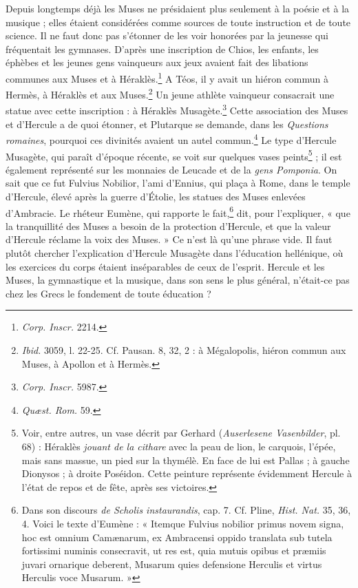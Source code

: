 \documentclass[a4paper, 11pt, oneside, polutonikogreek, french]{article}
\begin{document}
Depuis longtemps déjà les Muses ne présidaient plus seulement à la poésie et à la musique ; elles étaient considérées comme sources de toute instruction et de toute science. Il ne faut donc pas s'étonner de les voir honorées par la jeunesse qui fréquentait les gymnases. D'après une inscription de Chios, les enfants, les éphèbes et les jeunes gens vainqueurs aux jeux avaient fait des libations communes aux Muses et à Héraklès.\footnote{\emph{Corp. Inscr.} 2214.} A Téos, il y avait un hiéron commun à Hermès, à Héraklès et aux Muses.\footnote{\emph{Ibid.} 3059, l. 22-25. Cf. Pausan. 8, 32, 2 : à Mégalopolis, hiéron commun aux Muses, à Apollon et à Hermès.} Un jeune athlète vainqueur consacrait une statue avec cette inscription : à Héraklès Musagète.\footnote{\emph{Corp. Inscr.} 5987.} Cette association des Muses et d'Hercule a de quoi étonner, et Plutarque se demande, dans les \emph{Questions romaines}, pourquoi ces divinités avaient un autel commun.\footnote{\emph{Quæst. Rom.} 59.} Le type d'Hercule Musagète, qui paraît d'époque récente, se voit sur quelques vases peints\footnote{Voir, entre autres, un vase décrit par Gerhard (\emph{Auserlesene Vasenbilder}, pl. 68) : Héraklès \emph{jouant de la cithare} avec la peau de lion, le carquois, l'épée, mais sans massue, un pied sur la thymélè. En face de lui est Pallas ; à gauche Dionysos ; à droite Poséidon. Cette peinture représente évidemment Hercule à l'état de repos et de fête, après ses victoires.} ; il est également représenté sur les monnaies de Leucade et de la \emph{gens Pomponia}. On sait que ce fut Fulvius Nobilior, l'ami d'Ennius, qui plaça à Rome, dans le temple d'Hercule, élevé après la guerre d'Étolie, les statues des Muses enlevées d'Ambracie. Le rhéteur Eumène, qui rapporte le fait,\footnote{Dans son discours \emph{de Scholis instaurandis}, cap. 7. Cf. Pline, \emph{Hist. Nat.} 35, 36, 4. Voici le texte d'Eumène : « Itemque Fulvius nobilior primus novem signa, hoc est omnium Camænarum, ex Ambracensi oppido translata sub tutela fortissimi numinis consecravit, ut res est, quia mutuis opibus et præmiis juvari ornarique deberent, Musarum quies defensione Herculis et virtus Herculis voce Musarum. »} dit, pour l'expliquer, « que la tranquillité des Muses a besoin de la protection d'Hercule, et que la valeur d'Hercule réclame la voix des Muses. » Ce n'est là qu'une phrase vide. Il faut plutôt chercher l'explication d'Hercule Musagète dans l'éducation hellénique, où les exercices du corps étaient inséparables de ceux de l'esprit. Hercule et les Muses, la gymnastique et la musique, dans son sens le plus général, n'était-ce pas chez les Grecs le fondement de toute éducation ?
\end{document}
